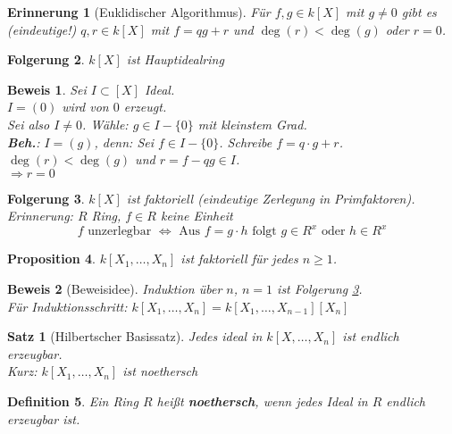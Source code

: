 \documentclass[a4paper,12pt]{report}
\theoremstyle{break}
\newtheorem{Satz}{Satz}
\newtheorem{Def}{Definition}[section]
\newtheorem{Erinn}[Def]{Erinnerung}
\newtheorem{Prop}[Def]{Proposition}
\newtheorem{Folg}[Def]{Folgerung}
\theoremstyle{nonumberbreak}
\newtheorem{Bew}{Beweis}
\theoremstyle{nonumberplain}
\newcommand{\emp}[1]{\textbf{\emph{#1}}}
\newcommand{\begriff}[1]{{\index{#1}}\emp{#1}}
\begin{document}
\begin{Erinn}[Euklidischer Algorithmus]
F\"ur $f,g\in k[X]$ mit $g\not= 0$ gibt es (eindeutige!) $q,r \in k[X]$ mit $f=qg+r$ und $\deg(r) < \deg(g)$ oder $r=0$.
\end{Erinn}

\begin{Folg}
$k[X]$ ist Hauptidealring
\end{Folg}

\begin{Bew}
Sei $I \subset[X]$ Ideal.\\
$I = (0)$ wird von $0$ erzeugt.\\
Sei also $I\not=0$. W\"ahle: $g \in I-\{0\}$ mit kleinstem Grad.\\
\textbf{Beh.}: $I = (g)$, \emph{denn:} Sei $f\in I-\{0\}$. Schreibe $f=q\cdot g+r$. $\deg(r)<\deg(g)$ und $r=f-qg \in I$.\\
$\Rightarrow r=0$
\end{Bew}

\begin{Folg}\label{folg:1.5}
$k[X]$ ist faktoriell (eindeutige Zerlegung in Primfaktoren).\\
\emph{Erinnerung}: $R$ Ring, $f \in R$ keine Einheit\\
	\[f \textrm{ unzerlegbar } \Leftrightarrow \textrm{ Aus } f = g\cdot h \textrm{ folgt } g \in R^x \textrm{ oder } h\in R^x\]
\end{Folg}

\begin{Prop}
$k[X_1, \dots, X_n]$ ist faktoriell f\"ur jedes $n\ge 1$.\\
\end{Prop}

\begin{Bew}[Beweisidee]
Induktion \"uber $n$, $n = 1$ ist Folgerung \ref{folg:1.5}.\\
F\"ur Induktionsschritt: $k[X_1,\dots, X_n] = k[X_1,\dots,X_{n-1}][X_n]$
\end{Bew}

\begin{Satz}[Hilbertscher Basissatz]\label{satz1}
Jedes ideal in $k[X,\dots ,X_n]$ ist endlich erzeugbar.\\
\emph{Kurz:}	$k[X_1,\dots, X_n]$ ist noethersch
\end{Satz}

\begin{Def}
Ein Ring $R$ hei\ss t \begriff{noethersch}, wenn jedes Ideal in $R$ endlich erzeugbar ist.
\end{Def}
\end{document}
